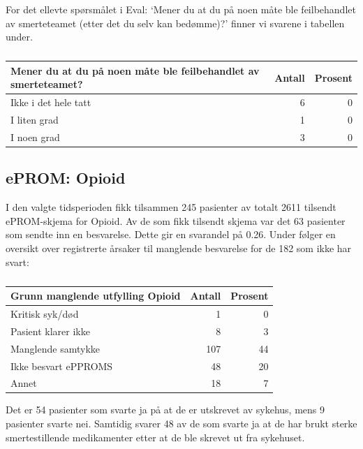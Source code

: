 \documentclass[
]{article}
\begin{document}
For det ellevte spørsmålet i Eval: `Mener du at du på noen måte ble
feilbehandlet av smerteteamet (etter det du selv kan bedømme)?' finner
vi svarene i tabellen under.

\begin{table}

\caption{\label{tab:evalu}}
\centering
\begin{tabular}[t]{l|r|r}
\hline
Mener du at du på noen måte ble feilbehandlet av smerteteamet? & Antall  & Prosent\\
\hline
Ikke i det hele tatt & 6 & 0\\
\hline
I liten grad & 1 & 0\\
\hline
I noen grad & 3 & 0\\
\hline
\end{tabular}
\end{table}

\hypertarget{eprom-opioid}{%
\subsection{ePROM: Opioid}\label{eprom-opioid}}

I den valgte tidsperioden fikk tilsammen 245 pasienter av totalt 2611
tilsendt ePROM-skjema for Opioid. Av de som fikk tilsendt skjema var det
63 pasienter som sendte inn en besvarelse. Dette gir en svarandel på
0.26. Under følger en oversikt over registrerte årsaker til manglende
besvarelse for de 182 som ikke har svart:

\begin{table}

\caption{\label{tab:opi}}
\centering
\begin{tabular}[t]{l|r|r}
\hline
Grunn manglende utfylling Opioid & Antall  & Prosent\\
\hline
Kritisk syk/død & 1 & 0\\
\hline
Pasient klarer ikke & 8 & 3\\
\hline
Manglende samtykke & 107 & 44\\
\hline
Ikke besvart ePPROMS & 48 & 20\\
\hline
Annet & 18 & 7\\
\hline
\end{tabular}
\end{table}

Det er 54 pasienter som svarte ja på at de er utskrevet av sykehus, mens
9 pasienter svarte nei. Samtidig svarer 48 av de som svarte ja at de har
brukt sterke smertestillende medikamenter etter at de ble skrevet ut fra
sykehuset.
\end{document}
